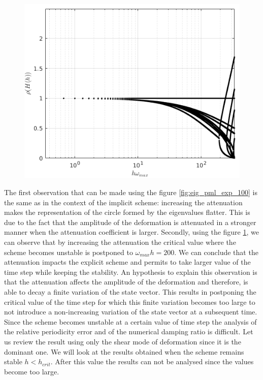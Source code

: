 \begin{itemize}
\begin{figure}[H]
\begin{minipage}{.5\textwidth}
  \includegraphics[width=.99\linewidth]{images/spect_rad_pml_exp_100.png}
  \label{fig:spect_rad_pml_exp_100}
\end{minipage}
\end{figure} 
The first observation that can be made using the figure \ref{fig:eig_pml_exp_100} is the same as in the context of the implicit scheme: increasing the attenuation makes the representation of the circle formed by the eigenvalues flatter. This is due to the fact that the amplitude of the deformation is attenuated in a stronger manner when the attenuation coefficient is larger. Secondly, using the figure \ref{fig:spect_rad_pml_exp_100}, we can observe that by increasing the attenuation the critical value where the scheme becomes unstable is postponed to $\omega_{max} h = 200$. We can conclude that the attenuation impacts the explicit scheme and permits to take larger value of the time step while keeping the stability. An hypothesis to explain this observation is that the attenuation affects the amplitude of the deformation and therefore, is able to decay a finite variation of the state vector. This results in postponing the critical value of the time step for which this finite variation becomes too large to not introduce a non-increasing variation of the state vector at a subsequent time. \\
Since the scheme becomes unstable at a certain value of time step the analysis of the relative periodicity error and of the numerical damping ratio is difficult. Let us review the result using only the shear mode of deformation since it is the dominant one. We will look at the results obtained when the scheme remains stable $h < h_{crit}$. After this value the results can not be analysed since the values become too large.  

\end{itemize}
